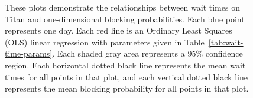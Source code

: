\begin{figure}
  \vspace{1em}
  \caption{These plots demonstrate the relationships between wait times on
Titan and one-dimensional blocking probabilities. Each blue point represents
one day. Each red line is an Ordinary Least Squares (OLS) linear regression
with parameters given in Table~\ref{tab:wait-time-params}. Each shaded gray
area represents a 95\% confidence region. Each horizontal dotted black line
represents the mean wait times for all points in that plot, and each vertical
dotted black line represents the mean blocking probability for all points in
that plot.}
\end{figure}


